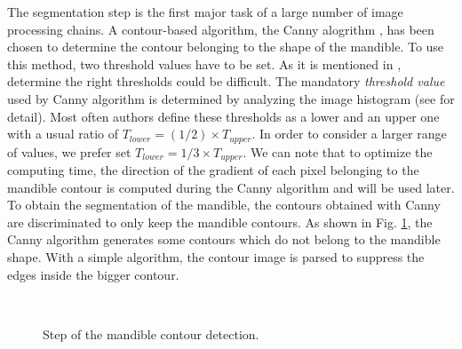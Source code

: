 \documentclass[twoside,twocolumn,10pt]{article}
\begin{document}
The segmentation step is the first major task of a large number of image processing
chains. A contour-based algorithm, the Canny alogrithm
\cite{canny1986computational}, has been chosen to determine the  contour belonging to the shape of the mandible.
To use this method, two threshold values have to be set. As it is
mentioned in \cite{adaptiveCanny}, determine the right thresholds
could be difficult. The mandatory \textit{threshold value} used by Canny algorithm is determined by analyzing the image
histogram (see \cite{leestimating} for detail). Most often authors define these thresholds as a lower and an upper one with a usual ratio of $T_{lower} = (1/2) \times T_{upper}$.
In order to consider a larger range of values, we prefer set $T_{lower} = 1/3 \times T_{upper}$.
We can note that to optimize the computing time, the direction of the gradient of each pixel belonging to the mandible contour is computed during the Canny algorithm and will be used later.
To obtain the segmentation of the mandible, the contours obtained with Canny are discriminated to only keep the mandible contours.
As shown in Fig. \ref{canny}, the Canny algorithm generates some contours which do not belong to the mandible shape.
With a simple algorithm, the contour image is parsed to suppress the edges inside the bigger contour.
\begin{figure}[htb]
\centering
{}~~ 
\caption{Step of the mandible contour detection.}
\label{canny}
\end{figure}
\end{document}
